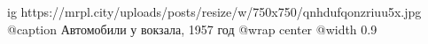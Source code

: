  
 
 
 
 

\ifcmt
  ig https://mrpl.city/uploads/posts/resize/w/750x750/qnhdufqonzriuu5x.jpg
	@caption Автомобили у вокзала, 1957 год
  @wrap center
  @width 0.9
\fi

